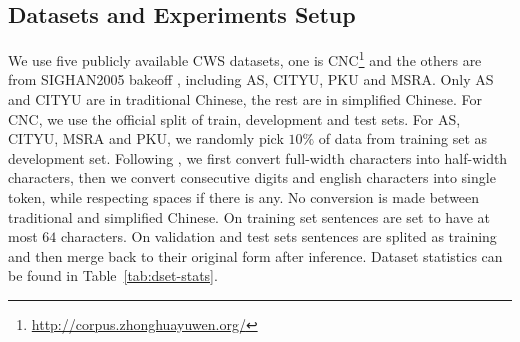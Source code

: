 \documentclass[11pt]{article}
\begin{document}

\subsection{Datasets and Experiments Setup}\label{sec:hps}

We use five publicly available CWS datasets, one is CNC\footnote{\url{http://corpus.zhonghuayuwen.org/}} and the others are from SIGHAN2005 bakeoff \cite{emerson-2005-second}, including AS, CITYU, PKU and MSRA.
Only AS and CITYU are in traditional Chinese, the rest are in simplified Chinese.
For CNC, we use the official split of train, development and test sets.
For AS, CITYU, MSRA and PKU, we randomly pick \(10\%\) of data from training set as development set.
Following \cite{cai-etal-2017-fast}, we first convert full-width characters into half-width characters, then we convert consecutive digits and english characters into single token, while respecting spaces if there is any.
No conversion is made between traditional and simplified Chinese.
On training set sentences are set to have at most \(64\) characters.
On validation and test sets sentences are splited as training and then merge back to their original form after inference.
Dataset statistics can be found in Table~\ref{tab:dset-stats}.
\end{document}
